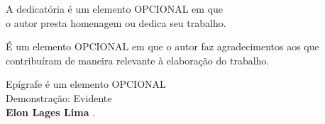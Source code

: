 \documentclass[mestre]{wstex}
\begin{document}


\begin{dedicatoria}

	A dedicatória é um elemento OPCIONAL em que \\ o autor presta homenagem ou dedica seu trabalho.

\end{dedicatoria}

\begin{agradecimentos}

	É um elemento OPCIONAL em que o autor faz agradecimentos aos que contribuíram de
	maneira relevante à elaboração do trabalho.

\end{agradecimentos}

\begin{epigrafe}

	Epígrafe é um elemento OPCIONAL \\
	Demonstração: Evidente \\
	\textbf{Elon Lages Lima} \cite[p. 154]{elon}.

\end{epigrafe}

\end{document}
